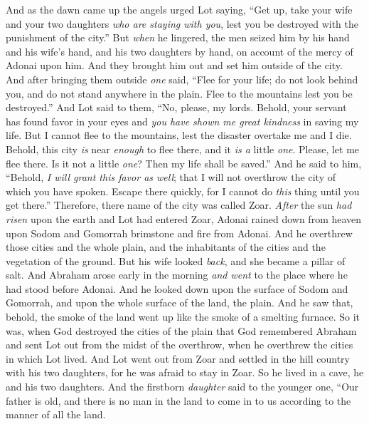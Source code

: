 \begin{biblechapter}
\verse And as the dawn came up the angels urged Lot saying, “Get up, take your wife and your two daughters \textit{who are staying with you}, lest you be destroyed with the punishment of the city.”
\verse But \textit{when} he lingered, the men seized him by his hand and his wife’s hand, and his two daughters by hand, on account of the mercy of Adonai upon him. And they brought him out and set him outside of the city.
\verse And after bringing them outside \textit{one} said, “Flee for your life; do not look behind you, and do not stand anywhere in the plain. Flee to the mountains lest you be destroyed.”
\verse And Lot said to them, “No, please, my lords.
\verse Behold, your servant has found favor in your eyes and \textit{you have shown me great kindness} in saving my life. But I cannot flee to the mountains, lest the disaster overtake me and I die.
\verse Behold, this city \textit{is} near \textit{enough} to flee there, and it \textit{is a} little \textit{one}. Please, let me flee there. Is it not a little \textit{one}? Then my life shall be saved.”
\verse And he said to him, “Behold, \textit{I will grant this favor as well}; that I will not overthrow the city of which you have spoken.
\verse Escape there quickly, for I cannot do \textit{this} thing until you get there.” Therefore, there name of the city was called Zoar.
 \textit{After} the sun \textit{had risen} upon the earth and Lot had entered Zoar,
\verse Adonai rained down from heaven upon Sodom and Gomorrah brimstone and fire from Adonai.
\verse And he overthrew those cities and the whole plain, and the inhabitants of the cities and the vegetation of the ground.
\verse But his wife looked \textit{back}, and she became a pillar of salt.
\verse And Abraham arose early in the morning \textit{and went} to the place where he had stood before Adonai.
\verse And he looked down upon the surface of Sodom and Gomorrah, and upon the whole surface of the land, the plain. And he saw that, behold, the smoke of the land went up like the smoke of a smelting furnace.
\verse So it was, when God destroyed the cities of the plain that God remembered Abraham and sent Lot out from the midst of the overthrow, when he overthrew the cities in which Lot lived.
 And Lot went out from Zoar and settled in the hill country with his two daughters, for he was afraid to stay in Zoar. So he lived in a cave, he and his two daughters.
\verse And the firstborn \textit{daughter} said to the younger one, “Our father is old, and there is no man in the land to come in to us according to the manner of all the land.

\end{biblechapter}
